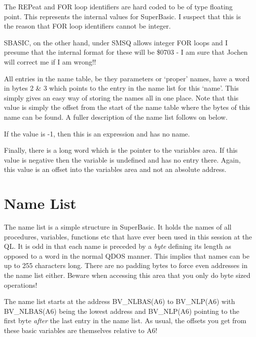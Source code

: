 \begin{note}
The REPeat and FOR loop identifiers are hard coded to be of type
      floating point. This represents the internal values for SuperBasic. I
      suspect that this is the reason that FOR loop identifiers cannot be
      integer. 

SBASIC, on the other hand, under SMSQ allows integer FOR loops and I presume
      that the internal format for these will be \$0703 -{} I am sure that Jochen
      will correct me if I am wrong!!
\end{note}

All entries in the name table, be they parameters or `proper'
    names, have a word in bytes 2 \& 3 which points to the entry in the
    name list for this `name'. This simply gives an easy way of storing the
    names all in one place. Note that this value is simply the offset from the
    start of the name table where the bytes of this name can be found. A
    fuller description of the name list follows on below.

If the value is -{}1, then this is an expression and has no
    name.

Finally, there is a long word which is the pointer to the variables
    area. If this value is negative then the variable is undefined and has no
    entry there. Again, this value is an offset into the variables area and
    not an absolute address.

\section{Name List}
\label{ch7-name-list}%

The name list is a simple structure in SuperBasic. It holds the
    names of all procedures, variables, functions etc that have ever been used
    in this session at the QL. It is odd in that each name is preceded by a
    \emph{byte} defining its length as opposed to a word in the normal QDOS manner.
    This implies that names can be up to 255 characters long. There are no
    padding bytes to force even addresses in the name list either. Beware when
    accessing this area that you only do byte sized operations!

The name list starts at the address BV\_NLBAS(A6) to BV\_NLP(A6) with
    BV\_NLBAS(A6) being the lowest address and BV\_NLP(A6) pointing to the first
    byte \emph{after} the last entry in the name list. As usual, the offsets you get
    from these basic variables are themselves relative to A6!

